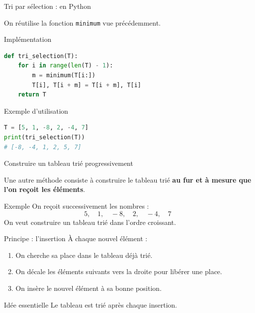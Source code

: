 \documentclass[10pt]{beamer}
\begin{document}
\begin{frame}[fragile]{Tri par sélection : en Python}

On réutilise la fonction \texttt{minimum} vue précédemment.

\begin{exampleblock}{Implémentation}
\begin{lstlisting}[language=Python]
def tri_selection(T):
    for i in range(len(T) - 1):
        m = minimum(T[i:])
        T[i], T[i + m] = T[i + m], T[i]
    return T
\end{lstlisting}
\end{exampleblock}


\begin{exampleblock}{Exemple d'utilisation}
\begin{lstlisting}[language=Python]
T = [5, 1, -8, 2, -4, 7]
print(tri_selection(T))
# [-8, -4, 1, 2, 5, 7]
\end{lstlisting}
\end{exampleblock}

\end{frame}
\begin{frame}{Construire un tableau trié progressivement}

Une autre méthode consiste à construire le tableau trié
\textbf{au fur et à mesure que l'on reçoit les éléments}.

\begin{exampleblock}{Exemple}
On reçoit successivement les nombres :
\[
5,\quad 1,\quad -8,\quad 2,\quad -4,\quad 7
\]
On veut construire un tableau trié dans l'ordre croissant.
\end{exampleblock}

\pause

\begin{block}{Principe : l'insertion}
À chaque nouvel élément :
\begin{enumerate}
    \item On cherche sa place dans le tableau déjà trié.
    \item On décale les éléments suivants vers la droite pour libérer une place.
    \item On insère le nouvel élément à sa bonne position.
\end{enumerate}
\end{block}

\pause

\begin{alertblock}{Idée essentielle}
Le tableau est trié après chaque insertion.
\end{alertblock}

\end{frame}
\end{document}
